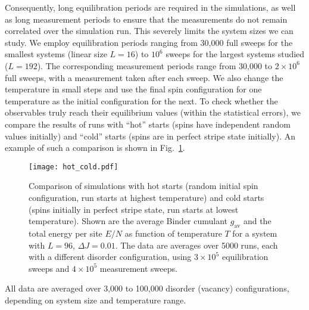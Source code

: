 \documentclass[twocolumn,showpacs,superscriptaddress,aps,prb]{revtex4-2}
\begin{document}
Consequently, long equilibration periods are required in the simulations, as well as long
measurement periods to ensure that the measurements do not remain correlated over the simulation
run. This severely limits the system sizes we can study.
We employ equilibration periods ranging from 30,000 full sweeps for the smallest
systems (linear size $L=16$) to $10^6$ sweeps for the largest systems studied ($L=192$).
The corresponding measurement periods range from 30,000 to $2\times 10^6$ full sweeps, with
a measurement taken after each sweep. We also change the temperature in small steps and
use the final spin configuration for one temperature as the initial configuration for the next.
To check whether the observables truly reach their equilibrium values (within the statistical
errors), we compare the results of runs with ``hot'' starts (spins have independent random
values initially) and ``cold'' starts (spins are in perfect stripe state initially).
An example of such a comparison is shown in Fig.\ \ref{fig:hot_cold}.
\begin{figure}
\texttt{[image: hot\_cold.pdf]}
\caption{Comparison of simulations with hot starts (random initial spin configuration, run starts
at highest temperature) and cold starts (spins initially in perfect stripe state, run starts
at lowest temperature). Shown are the average Binder cumulant $g_\mathrm{av}$ and the total energy per site $E/N$
as function of temperature $T$ for a system with $L=96$, $\Delta J =0.01$.
The data are averages over 5000 runs, each with a different disorder configuration,
using $3\times 10^5$ equilibration sweeps and $4 \times 10^5$ measurement sweeps. }
\label{fig:hot_cold}
\end{figure}
All data are averaged over 3,000 to 100,000 disorder (vacancy) configurations, depending
on system size and temperature range.
\end{document}
